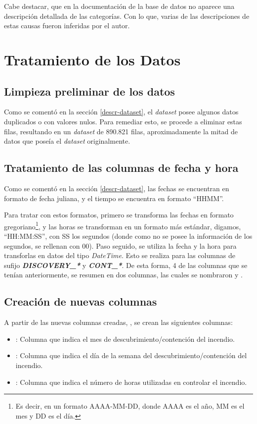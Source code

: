 Cabe destacar, que en la documentación de la base de datos no aparece una descripción detallada de las categorías. Con lo que, varias de las descripciones de estas causas fueron inferidas por el autor.

\section{Tratamiento de los Datos}
\subsection{Limpieza preliminar de los datos}
Como se comentó en la sección \ref{descr-dataset}, el \textit{dataset} posee algunos datos duplicados o con valores nulos. Para remediar esto, se procede a eliminar estas filas, resultando en un \textit{dataset} de 890.821 filas, aproximadamente la mitad de datos que poseía el \textit{dataset} originalmente.

\subsection{Tratamiento de las columnas de fecha y hora}
Como se comentó en la sección \ref{descr-dataset}, las fechas se encuentran en formato de fecha juliana, y el tiempo se encuentra en formato ``HHMM''.

Para tratar con estos formatos, primero se transforma las fechas en formato gregoriano\footnote{Es decir, en un formato AAAA-MM-DD, donde AAAA es el año, MM es el mes y DD es el día.}, y las horas se transforman en un formato más estándar, digamos, ``HH:MM:SS'', con SS los segundos (donde como no se posee la información de los segundos, se rellenan con 00). Paso seguido, se utiliza la fecha y la hora para transforlas en datos del tipo \textit{DateTime}. Esto se realiza para las columnas de sufijo \textit{\textbf{DISCOVERY\_*}} y \textit{\textbf{CONT\_*}}. De esta forma, 4 de las columnas que se tenían anteriormente, se resumen en dos columnas, las cuales se nombraron  y .

\subsection{Creación de nuevas columnas}

A partir de las nuevas columnas creadas, , se crean las siguientes columnas:
\begin{itemize}
    \item {}: Columna que indica el mes de descubrimiento/contención del incendio.
    \item {}: Columna que indica el día de la semana del descubrimiento/contención del incendio.
    \item {}: Columna que indica el número de horas utilizadas en controlar el incendio.
\end{itemize}

